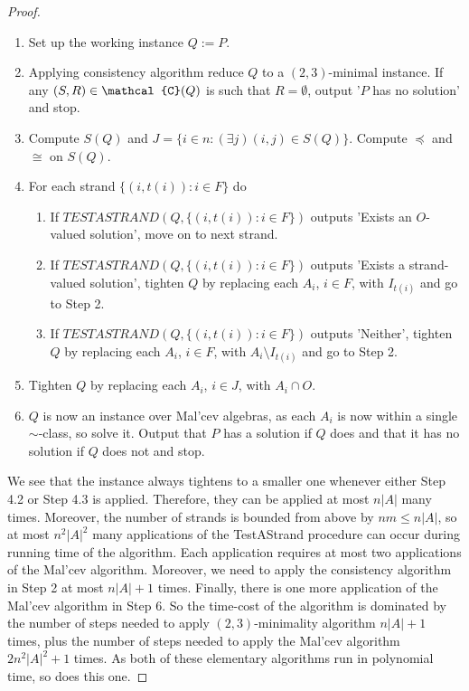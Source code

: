 \documentclass[10pt,a4paper]{amsart}
\newcommand{\vr}[1]{{\uppercase {\mathcal{#1}}}}
\begin{document}
\begin{proof}
\begin{enumerate}
\item[{\bf Step 1.}] Set up the working instance $Q:=P$.
\item[{\bf Step 2.}] Applying consistency algorithm reduce $Q$ to a $(2,3)$-minimal instance. If any $(S,R)\in\vr c(Q)$ is such that $R=\emptyset$, output '$P$ has no solution' and stop.
\item[{\bf Step 3.}] Compute $S(Q)$ and $J=\{i\in n:(\exists j)(i,j)\in S(Q)\}$. Compute $\preceq$ and $\cong$ on $S(Q)$.
\item[{\bf Step 4.}] For each strand $\{(i,t(i)):i\in F\}$ do
\begin{enumerate}
\item[{\bf Step 4.1.}] If $TESTASTRAND(Q,\{(i,t(i)):i\in F\})$ outputs 'Exists an $O$-valued solution', move on to next strand.
\item[{\bf Step 4.2.}] If  $TESTASTRAND(Q,\{(i,t(i)):i\in F\})$ outputs 'Exists a strand-valued solution', tighten $Q$ by replacing each $A_i$, $i\in F$, with $I_{t(i)}$ and go to Step 2.
\item[{\bf Step 4.3.}] If $TESTASTRAND(Q,\{(i,t(i)):i\in F\})$ outputs 'Neither', tighten $Q$ by replacing each $A_i$, $i\in F$, with  $A_i\setminus I_{t(i)}$ and go to Step 2.
\end{enumerate}
\item[{\bf Step 5.}] Tighten $Q$ by replacing each $A_i$, $i\in J$, with  $A_i\cap O$.
\item[{\bf Step 6.}] $Q$ is now an instance over Mal'cev algebras, as each $A_i$ is now within a single $\sim$-class, so solve it. Output that $P$ has a solution if $Q$ does and that it has no solution if $Q$ does not and stop.
\end{enumerate}

We see that the instance always tightens to a smaller one whenever either Step 4.2 or Step 4.3 is applied. Therefore, they can be applied at most $n|A|$ many times. Moreover, the number of strands is bounded from above by $nm\leq n|A|$, so at most $n^2|A|^2$ many applications of the TestAStrand procedure can occur during running time of the algorithm. Each application requires at most two applications of the Mal'cev algorithm. Moreover, we need to apply the consistency algorithm in Step 2 at most $n|A|+1$ times. Finally, there is one more application of the Mal'cev algorithm in Step 6. So the time-cost of the algorithm is dominated by the number of steps needed to apply $(2,3)$-minimality algorithm $n|A|+1$ times, plus the number of steps needed to apply the Mal'cev algorithm $2n^2|A|^2+1$ times. As both of these elementary algorithms run in  polynomial time, so does this one.


\end{proof}
\end{document}
